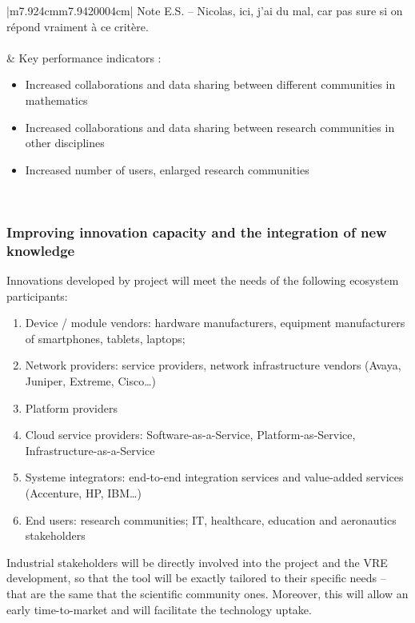 \begin{supertabular}{|m{7.924cm}m{7.9420004cm}|}
Note E.S. – Nicolas, ici, j'ai du mal, car pas sure si on répond
vraiment à ce critère.\\\hline
{}\\\hline
{} &
Key performance indicators :

\begin{itemize}
\item Increased collaborations and data sharing between different
communities in  mathematics\item Increased collaborations and data
sharing between research communities in other disciplines\item
Increased number of users, enlarged research communities\end{itemize}
\\\hline
\end{supertabular}

\subsubsection{Improving innovation capacity and the integration of new knowledge}


 Innovations developed by \TheProject project will meet the needs of the
following ecosystem participants:

\begin{enumerate}
\item Device / module vendors: hardware manufacturers, equipment
manufacturers of smartphones, tablets, laptops;
\item Network providers: service providers, network infrastructure
vendors (Avaya, Juniper, Extreme, Cisco…)
\item Platform providers
\item Cloud service providers: Software-as-a-Service,
Platform-as-Service, Infrastructure-as-a-Service
\item Systeme integrators: end-to-end integration services and
value-added services (Accenture, HP, IBM…)
\item End users: research communities; IT, healthcare, education and
aeronautics stakeholders
\end{enumerate}
Industrial stakeholders will be directly involved into the project and
the VRE development, so that the tool will be exactly tailored to their
specific needs – that are the same that the scientific community ones.
Moreover, this will allow an early time-to-market and will facilitate
the technology uptake.

